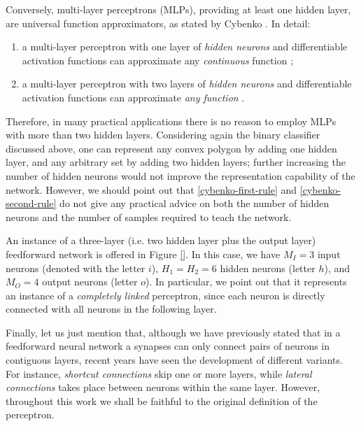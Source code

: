 \documentclass[11pt, a4paper]{report}
\numberwithin{equation}{chapter}
\theoremstyle{theorem}
\theoremstyle{definition}
\numberwithin{figure}{section}
\begin{document}
		Conversely, multi-layer perceptrons (MLPs), providing at least one hidden layer, are universal function approximators, as stated by Cybenko \cite{Cyb88, Cyb89}. In detail:
		\begin{enumerate}[label=(\roman*)]
			\item a multi-layer perceptron with one layer of \emph{hidden neurons} and differentiable activation functions can approximate any \emph{continuous} function \cite{Cyb89};
			\label{cybenko-first-rule}
			\item a multi-layer perceptron with two layers of \emph{hidden neurons} and differentiable activation functions can approximate \emph{any function} \cite{Cyb88}.
			\label{cybenko-second-rule}
		\end{enumerate}
		Therefore, in many practical applications there is no reason to employ MLPs with more than two hidden layers. Considering again the binary classifier discussed above, one can represent any convex polygon by adding one hidden layer, and any arbitrary set by adding two hidden layers; further increasing the number of hidden neurons would not improve the representation capability of the network. However, we should point out that \ref{cybenko-first-rule} and \ref{cybenko-second-rule} do not give any practical advice on both the number of hidden neurons and the number of samples required to teach the network.
		
		An instance of a three-layer (i.e. two hidden layer plus the output layer) feedforward network is offered in Figure \ref{}. In this case, we have $M_I = 3$ input neurons (denoted with the letter $i$), $H_1 = H_2 = 6$ hidden neurons (letter $h$), and $M_O = 4$ output neurons (letter $o$). In particular, we point out that it represents an instance of a \emph{completely linked} perceptron, since each neuron is directly connected with all neurons in the following layer.
		
		Finally, let us just mention that, although we have previously stated that in a feedforward neural network a synapses can only connect pairs of neurons in contiguous layers, recent years have seen the development of different variants. For instance, \emph{shortcut connections} skip one or more layers, while \emph{lateral connections} takes place between neurons within the same layer. However, throughout this work we shall be faithful to the original definition of the perceptron.
				
		\vspace*{0.3cm}
		
\end{document}
